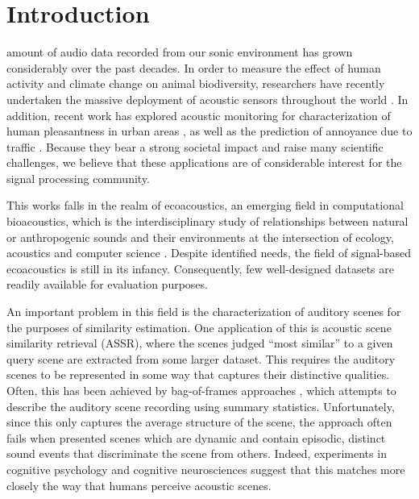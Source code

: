 \documentclass[journal]{IEEEtran}
\begin{document}
%
\IEEEpeerreviewmaketitle

\section{Introduction}

 amount of audio data recorded from our sonic environment has grown considerably over the past decades.
In order to measure the effect of human activity and climate change on animal biodiversity, researchers have recently undertaken the massive deployment of acoustic sensors throughout the world \cite{warren2006urban, NessSST13, stowell13b}. 
In addition, recent work has explored acoustic monitoring for characterization of human pleasantness in urban areas \cite{guyot2005urban, ricciardi2015sound}, as well as the prediction of annoyance due to traffic \cite{gloaguen}.
Because they bear a strong societal impact and raise many scientific challenges, we believe that these applications are of considerable interest for the signal processing community.

This works falls in the realm of ecoacoustics, an emerging field in computational bioacoustics, which is the interdisciplinary study of relationships between natural or anthropogenic sounds and their environments at the intersection of ecology, acoustics and computer science \cite{krause}. Despite identified needs, the field of signal-based ecoacoustics is still in its infancy.
Consequently, few well-designed datasets are readily available for evaluation purposes.

An important problem in this field is the characterization of auditory scenes for the purposes of similarity estimation. One application of this is acoustic scene similarity retrieval (ASSR), where the scenes judged ``most similar'' to a given query scene are extracted from some larger dataset. This requires the auditory scenes to be represented in some way that captures their distinctive qualities. Often, this has been achieved by bag-of-frames approaches \cite{aucouturier2007bag}, which attempts to describe the auditory scene recording using summary statistics. Unfortunately, since this only captures the average structure of the scene, the approach often fails when presented scenes which are dynamic and contain episodic, distinct sound events that discriminate the scene from others. Indeed, experiments in cognitive psychology \cite{dubois2006cognitive} and cognitive neurosciences \cite{nelken2004processing} suggest that this matches more closely the way that humans perceive acoustic scenes. 
\end{document}
